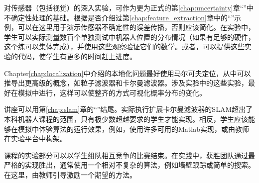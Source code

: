 对传感器（包括视觉）的深入实验，可作为更为正式的第\ref{chap:uncertainty}章“”中不确定性处理的基础。根据是否介绍过第\ref{chap:feature_extraction}章中的“”示例，可以在这里用于演示传感器不确定性的误差传播，否则应该简化。在实验中，学生可以实际测量数百个单独测试中机器人位置的分布情况（如果有足够的硬件，这个练可以集体完成），并使用这些观察验证它们的数学。或者，可以提供这些实验的代码，使学生有更多的时间赶上进度。


Chapter\ref{chap:localization}中介绍的本地化问题最好使用马尔可夫定位，从中可以推导出更高级的概念，如粒子滤波器和卡尔曼滤波器。涉及实验中的这些实验，最好在模拟中进行，这样可以使整齐的方式可视化概率分布的变化。


讲座可以用第\ref{chap:slam}章的“”结尾。实际执行扩展卡尔曼滤波器的SLAM超出了本科机器人课程的范围，只有极少数超越要求的学生才能实现。相反，学生应该能够在模拟中体验算法的运行效果，例如，使用许多可用的Matlab实现，或由教师在实验平台中构架。


课程的实验部分可以以学生组队相互竞争的比赛结束。在实践中，获胜团队通过最严格的实现胜出，通常使用一个相对不复杂的算法，例如墙壁跟踪或简单的搜索。在这里，由教师引导激励一个期望的方法。

